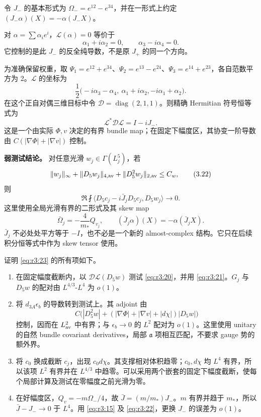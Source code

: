 \documentclass[UTF8,11pt,openany,oneside,fontset=none]{ctexbook}
\providecommand{\tightlist}{\setlength{\itemsep}{1pt}\setlength{\parskip}{0pt}}
\begin{document}
令 \(J_-\) 的基本形式为 \(\Omega_-=e^{12}-e^{34}\)，并在一形式上约定 \((J_-\alpha)(X)=-\alpha(J_-X)\)。

对 \(\alpha=\sum\alpha_i e^i\)，\(\mathcal L(\alpha)=0\) 等价于 \[
 \alpha_1+i\alpha_2=0,\qquad\alpha_3-i\alpha_4=0.
\] 它控制的是此 \(J_-\) 的反全纯导数，不是原 \(J_+\) 的同一个方向。

为准确保留权重，取 \(\Psi_1=e^{12}+e^{34}\)、\(\Psi_2=e^{13}-e^{24}\)、\(\Psi_3=e^{14}+e^{23}\)，各自范数平方为 2。\(\mathcal L\) 的坐标为 \[
 \frac12\bigl(-i\alpha_3-\alpha_4,\ \alpha_1+i\alpha_2,
                                      -i\alpha_1+\alpha_2\bigr).
\] 在这个正自对偶三维目标中令 \(\mathcal D=\operatorname{diag}(2,1,1)\)。则精确 Hermitian 符号恒等式为 \[
 \boxed{\mathcal L^*\mathcal D\mathcal L=I-iJ_-.}
 \tag{3.21}\label{eq:r3:21}
\] 这是一个由实际 \(\Phi,v\) 决定的有界 bundle map；在固定下幅度区，其协变一阶导数由 \(C(|\nabla\Phi|+|\nabla v|)\) 控制。

\textbf{弱测试结论。} 对任意光滑 \(w_j\in\Gamma(L_j^5)\)，若 \[
 \|w_j\|_\infty+\|D_5w_j\|_{4,\rm av}
                      +\|D_5^2w_j\|_{2,\rm av}\le C_w,
 \tag{3.22}\label{eq:r3:22}
\] 则 \[
 \Re\fint\langle D_5c_j-i\bar J_jD_5c_j,D_5w_j\rangle\to0.
 \tag{3.23}\label{eq:r3:23}
\] 这里使用全局光滑有界的二形式及其 skew map \[
 \bar\Omega_j=-\frac4{m_*}Q_{v_j},\qquad
 (\bar J_j\alpha)(X)=-\alpha(\bar J_jX).
 \tag{3.24}\label{eq:r3:24}
\] \(\bar J_j\) 不必处处平方等于 \(-I\)，也不必是一个新的 almost-complex 结构。它只在后续积分恒等式中作为 skew tensor 使用。

证明 \eqref{eq:r3:23} 的所有项如下。

\begin{enumerate}
\def\labelenumi{\arabic{enumi}.}
\tightlist
\item
  在固定幅度截断内，以 \(\mathcal D\mathcal L(D_5w)\) 测试 \eqref{eq:r3:20}，并用 \eqref{eq:r3:21}。\(G_j\) 与 \(D_5w\) 的配对由 \(L^{4/3}\)-\(L^4\) 为 \(o(1)\)。
\item
  将 \(d_{3A}\epsilon_b\) 的导数转到测试上。其 adjoint 由 \[
   C\bigl(|D_5^2w|+(|\nabla\Phi|+|\nabla v|+|d\chi|)|D_5w|\bigr)
  \] 控制，因而在 \(L^2_{\rm av}\) 中有界；与 \(\epsilon_b\to0\) 的 \(L^2\) 配对为 \(o(1)\)。这里使用 unitary 的自然 bundle covariant derivatives，局部 \(\mathfrak a\) 项相互匹配，不要求 gauge 势的额外界。
\item
  将 \(c_0\) 换成截断 \(c_j\)，出现 \(c_0d\chi\)。其支撑相对体积趋零；\(c_0,d\chi\) 均 \(L^4\) 有界，所以该项 \(L^2\) 有界并在 \(L^{4/3}\) 中趋零。可以采用两个嵌套的固定下幅度截断，使每个局部计算及测试在零幅度之前光滑为零。
\item
  在好幅度区，\(Q_v=-m\Omega_-/4\)，故 \(\bar J=(m/m_*)J_-\)。\(m\) 有界并趋于 \(m_*\)，所以 \(\bar J-J_-\to0\) 于 \(L^4\)。用 \eqref{eq:r3:15} 及 \eqref{eq:r3:22}，更换 \(J_-\) 的误差为 \(o(1)\)。
\end{enumerate}
\end{document}
